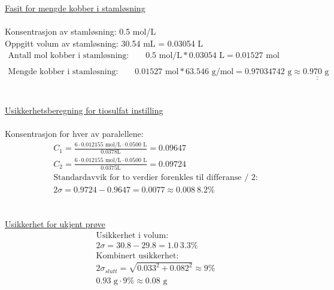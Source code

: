 \\
\\
\underline{Fasit for mengde kobber i stamløsning}\\
\\
Konsentrasjon av stamløsning: 0.5 mol/L\\
Oppgitt volum av stamløsning: 30.54 mL = 0.03054 L\\
\begin{gather*}
    \text{Antall mol kobber i stamløsning:} \qquad
    0.5 \text{ mol/L} * 0.03054 \text{ L} = 0.01527 \text{ mol}\\
    \\
    \text{Mengde kobber i stamløsning:} \qquad
    0.01527 \text{ mol} * 63.546 \text{ g/mol} = 0.97034742 \text{ g} \approx \underline{\underline{0.970 \text{ g }}}
\end{gather*}
\\
\\
\underline{Usikkerhetsberegning for tiosulfat instilling}\\
\\
Konsentrasjon for hver av paralellene:
\begin{gather*}
    C_1 = \frac{6 \cdot 0.012155 \text{ mol/L} \cdot 0.0500 \text{ L}}{0.0378 \text{L}} = 0.09647
    \\
    C_2 = \frac{6 \cdot 0.012155 \text{ mol/L} \cdot 0.0500 \text{ L}}{0.0375 \text{L}} = 0.09724
    \\
    \text{Standardavvik for to verdier forenkles til differanse / 2:}
    \\
    2 \sigma = 0.9724 - 0.9647 = 0.0077 \approx 0.008 ~ 8.2 \%
\end{gather*}
\\
\\
\underline{Usikkerhet for ukjent prøve}
\\
\begin{gather*}
    \text{Usikkerhet i volum:}\\
    2 \sigma = 30.8 - 29.8 = 1.0 ~ 3.3 \% \\
    \text{Kombinert usikkerhet:} \\
    2 \sigma_{slutt} = \sqrt{0.033^2 + 0.082^2} \approx 9 \% \\
    0.93 \text{ g} \cdot 9\% \approx 0.08 \text{ g}
\end{gather*}

